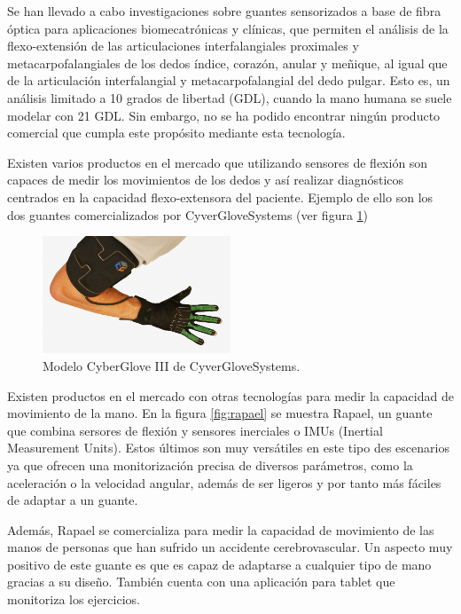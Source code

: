 Se han llevado a cabo investigaciones sobre guantes sensorizados a base de fibra óptica para aplicaciones biomecatrónicas y clínicas, que permiten el análisis de la flexo-extensión de las articulaciones interfalangiales proximales y metacarpofalangiales de los dedos índice, corazón, anular y meñique, al igual que de la articulación interfalangial y metacarpofalangial del dedo pulgar. Esto es, un análisis limitado a 10 grados de libertad (GDL), cuando la mano humana se suele modelar con 21 GDL. Sin embargo, no se ha podido encontrar ningún producto comercial que cumpla este propósito mediante esta tecnología.

Existen varios productos en el mercado que utilizando sensores de flexión son capaces de medir los movimientos de los dedos y así realizar diagnósticos centrados en la capacidad flexo-extensora del paciente. Ejemplo de ello son los dos guantes comercializados por CyverGloveSystems (ver figura \ref{fig:CGS}) \cite{CGS}

\begin{figure}[H]
	\centering
	\includegraphics[width=0.5\textwidth]{./img/cgs}
	\caption{Modelo CyberGlove III de CyverGloveSystems. }
	\label{fig:CGS}
\end{figure} 

Existen productos en el mercado con otras tecnologías para medir la capacidad de movimiento de la mano. En la figura \ref{fig:rapael} se muestra Rapael, un guante que combina sersores de flexión y sensores inerciales o IMUs (Inertial Measurement Units). Estos últimos son muy versátiles en este tipo des escenarios ya que ofrecen una monitorización precisa de diversos parámetros, como la aceleración o la velocidad angular, además de ser ligeros y por tanto más fáciles de adaptar a un guante.

Además, Rapael se comercializa para medir la capacidad de movimiento de las manos de personas que han sufrido un accidente cerebrovascular. Un aspecto muy positivo de este guante es que es capaz de adaptarse a cualquier tipo de mano gracias a su diseño. También cuenta con una aplicación para tablet que monitoriza los ejercicios.


